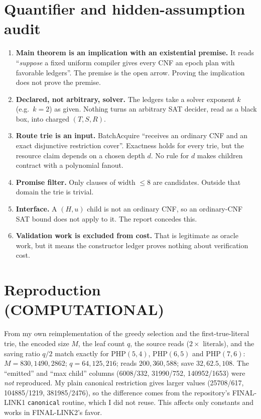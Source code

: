 \documentclass[11pt]{article}
\begin{document}
\section{Quantifier and hidden-assumption audit}
\begin{enumerate}
\item \textbf{Main theorem is an implication with an existential premise.} It reads ``\emph{suppose} a fixed uniform compiler gives every CNF an epoch plan with favorable ledgers''. The premise is the open arrow. Proving the implication does not prove the premise.
\item \textbf{Declared, not arbitrary, solver.} The ledgers take a solver exponent $k$ (e.g.\ $k=2$) as given. Nothing turns an arbitrary SAT decider, read as a black box, into charged $(T,S,R)$.
\item \textbf{Route trie is an input.} BatchAcquire ``receives an ordinary CNF and an exact disjunctive restriction cover''. Exactness holds for every trie, but the resource claim depends on a chosen depth $d$. No rule for $d$ makes children contract with a polynomial fanout.
\item \textbf{Promise filter.} Only clauses of width $\le 8$ are candidates. Outside that domain the trie is trivial.
\item \textbf{Interface.} A $(H,u)$ child is not an ordinary CNF, so an ordinary-CNF SAT bound does not apply to it. The report concedes this.
\item \textbf{Validation work is excluded from cost.} That is legitimate as oracle work, but it means the constructor ledger proves nothing about verification cost.
\end{enumerate}

\section{Reproduction (COMPUTATIONAL)}
From my own reimplementation of the greedy selection and the first-true-literal trie, the encoded size $M$, the leaf count $q$, the source reads ($2\times$ literals), and the saving ratio $q/2$ match exactly for PHP$(5,4)$, PHP$(6,5)$ and PHP$(7,6)$: $M=830,1490,2862$; $q=64,125,216$; reads $200,360,588$; save $32,62.5,108$. The ``emitted'' and ``max child'' columns (6008/332, 31990/752, 140952/1653) were \emph{not} reproduced. My plain canonical restriction gives larger values (25708/617, 104885/1219, 381985/2476), so the difference comes from the repository's FINAL-LINK1 \texttt{canonical} routine, which I did not reuse. This affects only constants and works in FINAL-LINK2's favor.
\end{document}
